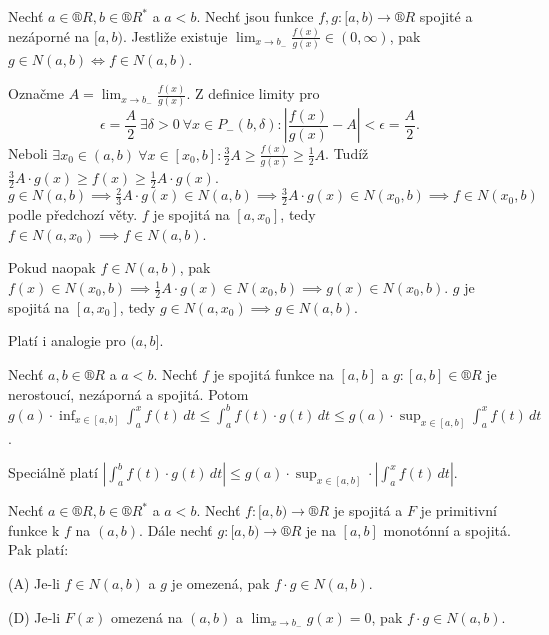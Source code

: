 \documentclass[12pt]{article}                   %
\begin{document}
        \begin{veta}
            Nechť $a \in ®R, b \in ®R^*$ a $a < b$. Nechť jsou funkce $f, g: [a, b) \rightarrow ®R$ spojité a nezáporné na $[a, b)$. Jestliže existuje $\lim_{x \rightarrow b_-} \frac{f(x)}{g(x)} \in (0, ∞)$, pak $g \in N(a, b) \Leftrightarrow f \in N(a, b)$.

            \begin{dukazin}
                Označme $A = \lim_{x \rightarrow b_-} \frac{f(x)}{g(x)}$. Z definice limity pro
                $$ \epsilon = \frac{A}{2}\ \exists \delta > 0\ \forall x \in P_-(b, \delta): |\frac{f(x)}{g(x)} - A| < \epsilon = \frac{A}{2}. $$
                Neboli $\exists x_0 \in (a, b)\ \forall x \in [x_0, b]: \frac{3}{2}A ≥ \frac{f(x)}{g(x)} ≥ \frac{1}{2}A$. Tudíž $\frac{3}{2}A·g(x) ≥ f(x) ≥ \frac{1}{2}A·g(x)$. $g \in N(a, b) \implies \frac{2}{3}A·g(x) \in N(a, b) \implies \frac{3}{2}A·g(x)\in N(x_0, b) \implies f\in N(x_0, b)$ podle předchozí věty. $f$ je spojitá na $[a, x_0]$, tedy $f \in N(a, x_0) \implies f \in N(a, b)$.

                Pokud naopak $f \in N(a, b)$, pak $f(x) \in N(x_0, b) \implies \frac{1}{2}A·g(x) \in N(x_0, b) \implies g(x) \in N(x_0, b)$. $g$ je spojitá na $[a, x_0]$, tedy $g \in N(a, x_0) \implies g \in N(a, b)$.
            \end{dukazin}
        \end{veta}

        \begin{poznamka}
            Platí i analogie pro $(a, b]$.
        \end{poznamka}

        \begin{lemma}
            Nechť $a, b \in ®R$ a $a < b$. Nechť $f$ je spojitá funkce na $[a, b]$ a $g:[a, b] \in ®R$ je nerostoucí, nezáporná a spojitá. Potom $g(a)·\inf_{x \in [a, b]} \int_a^x f(t)\,dt ≤ \int_a^b f(t)·g(t)\,dt ≤ g(a)·\sup_{x \in [a, b]}\int_a^x f(t)\,dt$.

            Speciálně platí $|\int_a^b f(t)·g(t)\,dt| ≤ g(a)·\sup_{x \in [a, b]}·|\int_a^x f(t)\,dt|$.
        \end{lemma}

        \begin{veta}
            Nechť $a \in ®R, b \in ®R^*$ a $a < b$. Nechť $f:[a, b) \rightarrow ®R$ je spojitá a $F$ je primitivní funkce k $f$ na $(a, b)$. Dále nechť $g:[a, b) \rightarrow ®R$ je na $[a, b]$ monotónní a spojitá. Pak platí:

            (A) Je-li $f \in N(a, b)$ a $g$ je omezená, pak $f·g \in N(a, b)$.

            (D) Je-li $F(x)$ omezená na $(a, b)$ a $\lim_{x \rightarrow b_-} g(x) = 0$, pak $f·g \in N(a, b)$.
        \end{veta}
\end{document}
